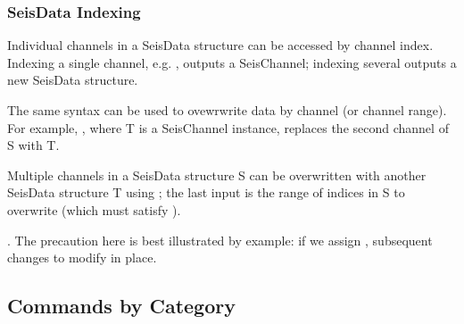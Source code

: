 \documentclass[letterpaper,11pt,english]{sphinxmanual}
\begin{document}
\begin{sphinxVerbatim}[commandchars=\\\{\}]
   
   
    
\end{sphinxVerbatim}


\subsubsection{SeisData Indexing}
\label{\detokenize{src/seisdata:seisdata-indexing}}
Individual channels in a SeisData structure can be accessed by channel index. Indexing a single channel, e.g. , outputs a SeisChannel; indexing several outputs a new SeisData structure.

The same syntax can be used to ovewrwrite data by channel (or channel range). For example, , where T is a SeisChannel instance, replaces the second channel of S with T.

Multiple channels in a SeisData structure S can be overwritten with another SeisData structure T using ; the last input is the range of indices in S to overwrite (which must satisfy ).

. The precaution here is best illustrated by example: if we assign , subsequent changes to  modify  in place.


\subsection{Commands by Category}
\label{\detokenize{src/seisdata:commands-by-category}}
\end{document}

